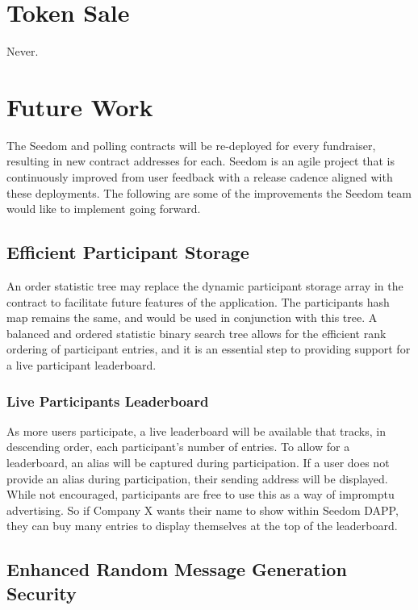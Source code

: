 \documentclass[11pt]{article}
\begin{document}
\section{Token Sale}
Never.

\section{Future Work}

The Seedom and polling contracts will be re-deployed for every fundraiser, resulting in new contract addresses for each. Seedom is an agile project that is continuously improved from user feedback with a release cadence aligned with these deployments. The following are some of the improvements the Seedom team would like to implement going forward.

\subsection{Efficient Participant Storage}

An order statistic tree \cite{5} may replace the dynamic participant storage array in the contract to facilitate future features of the application. The participants hash map remains the same, and would be used in conjunction with this tree. A balanced and ordered statistic binary search tree allows for the efficient rank ordering of participant entries, and it is an essential step to providing support for a live participant leaderboard.

\subsubsection{Live Participants Leaderboard}

As more users participate, a live leaderboard will be available that tracks, in descending order, each participant's number of entries. To allow for a leaderboard, an alias will be captured during participation. If a user does not provide an alias during participation, their sending address will be displayed. While not encouraged, participants are free to use this as a way of impromptu advertising. So if Company X wants their name to show within Seedom DAPP, they can buy many entries to display themselves at the top of the leaderboard.

\subsection{Enhanced Random Message Generation Security}
\end{document}

